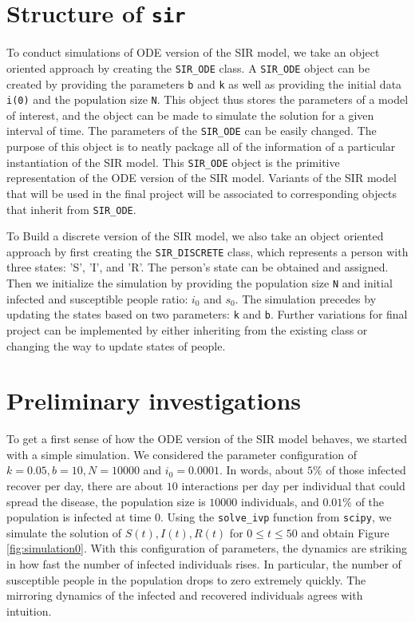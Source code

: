 \documentclass[12pt, reqno]{amsart}
\begin{document}
    \section{Structure of \texttt{sir}}

    To conduct simulations of ODE version of the SIR model, we take an object oriented approach by creating the \texttt{SIR\_ODE} class. A \texttt{SIR\_ODE} object can be created by providing the parameters \texttt{b} and \texttt{k} as well as providing the initial data \texttt{i(0)} and the population size \texttt{N}. This object thus stores the parameters of a model of interest, and the object can be made to simulate the solution for a given interval of time. The parameters of the \texttt{SIR\_ODE} can be easily changed. The purpose of this object is to neatly package all of the information of a particular instantiation of the SIR model. This \texttt{SIR\_ODE} object is the primitive representation of the ODE version of the SIR model. Variants of the SIR model that will be used in the final project will be associated to corresponding objects that inherit from \texttt{SIR\_ODE}. 

    To Build a discrete version of the SIR model, we also take an object oriented approach by first creating the \texttt{SIR\_DISCRETE} class, which represents a person with three states: 'S', 'I', and 'R'. The person's state can be obtained and assigned. Then we initialize the simulation by providing the population size \texttt{N} and initial infected and susceptible people ratio: \texttt{$i_0$} and \texttt{$s_0$}. The simulation precedes by updating the states based on two parameters: \texttt{k} and \texttt{b}. Further variations for final project can be implemented by either inheriting from the existing class or changing the way to update states of people.
    \section{Preliminary investigations}

    To get a first sense of how the ODE version of the SIR model behaves, we started with a simple simulation. We considered the parameter configuration of \(k = 0.05, b = 10, N = 10000\) and \(i_0 = 0.0001\). In words, about \(5\%\) of those infected recover per day, there are about \(10\) interactions per day per individual that could spread the disease, the population size is \(10000\) individuals, and \(0.01\%\) of the population is infected at time \(0\). Using the \texttt{solve\_ivp} function from \texttt{scipy}, we simulate the solution of \(S(t), I(t), R(t)\) for \(0 \leq t \leq 50\) and obtain Figure \ref{fig:simulation0}. With this configuration of parameters, the dynamics are striking in how fast the number of infected individuals rises. In particular, the number of susceptible people in the population drops to zero extremely quickly. The mirroring dynamics of the infected and recovered individuals agrees with intuition. 
\end{document}
